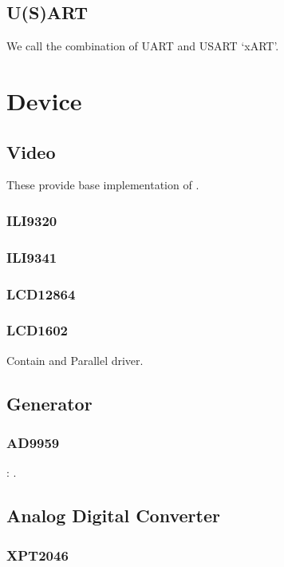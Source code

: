 \subsection{U(S)ART}

We call the combination of UART and USART `xART'. 

\section{Device}

\subsection{Video}

These provide base implementation of .

\subsubsection{ILI9320}
\subsubsection{ILI9341}
\subsubsection{LCD12864}
\subsubsection{LCD1602}

Contain  and {Parallel} driver.

\subsection{Generator}

\subsubsection{AD9959}

: .

\subsection{Analog Digital Converter}

\subsubsection{XPT2046}

